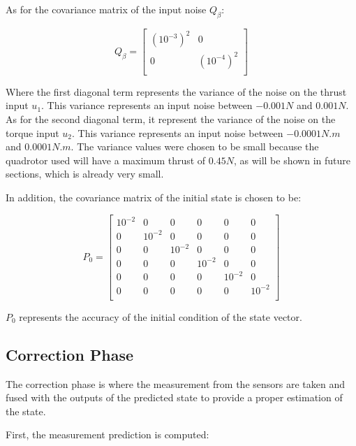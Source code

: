 \documentclass{thesisreport}
\begin{document}
As for the covariance matrix of the input noise $Q_{\beta}$:

\begin{equation}
	Q_{\beta} = \begin{bmatrix}
	(10^{-3})^2 & 0 \\
	0 & (10^{-4})^2 \\
	\end{bmatrix}
\end{equation}

Where the first diagonal term represents the variance of the noise on the thrust input $u_1$. This variance represents an input noise between $-0.001N$ and $0.001N$. As for the second diagonal term, it represent the variance of the noise on the torque input $u_2$. This variance represents  an input noise between $-0.0001N.m$ and $0.0001N.m$. The variance values were chosen to be small because the quadrotor used will have a maximum thrust of $0.45N$, as will be shown in future sections, which is already very small. 

\newpage

In addition, the covariance matrix of the initial state is chosen to be:

\begin{equation}
P_0 = \begin{bmatrix}
                10^{-2} & 0 & 0 & 0  & 0 & 0 \\
                0 & 10^{-2} & 0 & 0  & 0 & 0 \\
                0 & 0 & 10^{-2} & 0 & 0 & 0 \\
                0 & 0 & 0 & 10^{-2} & 0 & 0 \\
                0 & 0 & 0 & 0 & 10^{-2} & 0 \\
                0 & 0 & 0 & 0 & 0 & 10^{-2} \\
            \end{bmatrix}
\end{equation}

$P_0$ represents the accuracy of the initial condition of the state vector.

	\subsection{Correction Phase}
	The correction phase is where the measurement from the sensors are taken and fused with the outputs of the predicted state to provide a proper estimation of the state.
	
First, the measurement prediction is computed: 
\end{document}
